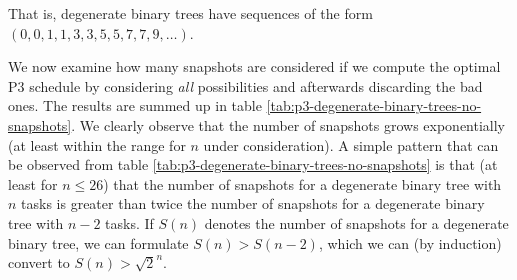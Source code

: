 That is, degenerate binary trees have sequences of the form $(0,0,1,1,3,3,5,5,7,7,9,\dots)$.

We now examine how many snapshots are considered if we compute the optimal P3 schedule by considering \emph{all} possibilities and afterwards discarding the bad ones. The results are summed up in table \ref{tab:p3-degenerate-binary-trees-no-snapshots}. We clearly observe that the number of snapshots grows exponentially (at least within the range for $n$ under consideration). A simple pattern that can be observed from table \ref{tab:p3-degenerate-binary-trees-no-snapshots} is that (at least for $n\leq 26$) that the number of snapshots for a degenerate binary tree with $n$ tasks is greater than twice the number of snapshots for a degenerate binary tree with $n-2$ tasks. If $S(n)$ denotes the number of snapshots for a degenerate binary tree, we can formulate $S(n)>S(n-2)$, which we can (by induction) convert to $S(n) > \sqrt 2 ^ n$.

